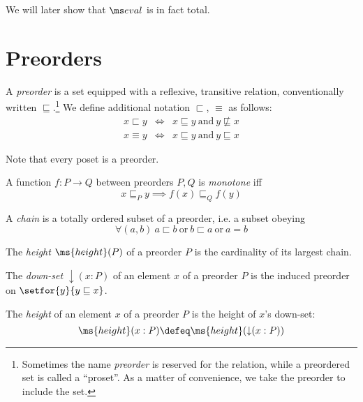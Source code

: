 \documentclass{article}
\renewcommand{\land}{~\text{and}~}
\renewcommand{\lor}{~\text{or}~}
\newcommand{\ale}{\sqsubseteq}
\newcommand{\alt}{\sqsubset}
\newcommand{\aeq}{\equiv}
\newcommand{\eqposet}[1]{\ms{Eq}(#1)}
\renewcommand{\eqposet}[1]{\|{#1}\|}
\newcommand{\height}{\ms{height}}
\newcommand{\elemheight}[2]{\height(#2 : #1)}
\newcommand{\down}[2]{\mathop{\downarrow}(#2 : #1)}
\begin{document}
We will later show that $\evalfn$ is in fact total.



\section{Preorders}

\begin{definition}
  A \emph{preorder} is a set equipped with a reflexive, transitive relation,
  conventionally written $\ale$.\footnote{Sometimes the name \emph{preorder} is
    reserved for the relation, while a preordered set is called a ``proset''. As
    a matter of convenience, we take the preorder to include the set.} We define
  additional notation $\alt$, $\aeq$ as follows:
  \begin{eqnarray*}
    x \alt y &\iff& x \ale y \land y \not\ale x\\
    x \aeq y &\iff& x \ale y \land y \ale x
  \end{eqnarray*}

  Note that every poset is a preorder.
\end{definition}

\begin{definition}
  A function $f : P \to Q$ between preorders $P,Q$ is \emph{monotone} iff
  \[ x \ale_P y \implies f(x) \ale_Q f(y) \]
\end{definition}

\begin{definition}
  A \emph{chain} is a totally ordered subset of a preorder, i.e. a subset
  obeying \[\forall(a, b)\ a \alt b \lor b \alt a \lor a = b \]
\end{definition}

\begin{definition}
  The \emph{height} $\height(P)$ of a preorder $P$ is the cardinality of its largest chain.
\end{definition}


\begin{definition}
  The \emph{down-set} $\down{P}{x}$ of an element $x$ of a preorder $P$ is the
  induced preorder on $\setfor{y}{y \ale x}$.
\end{definition}

\begin{definition}
  The \emph{height} of an element $x$ of a preorder $P$ is the height of $x$'s
  down-set: \[\elemheight{P}{x} \defeq \height(\down{P}{x})\]
\end{definition}
\end{document}
